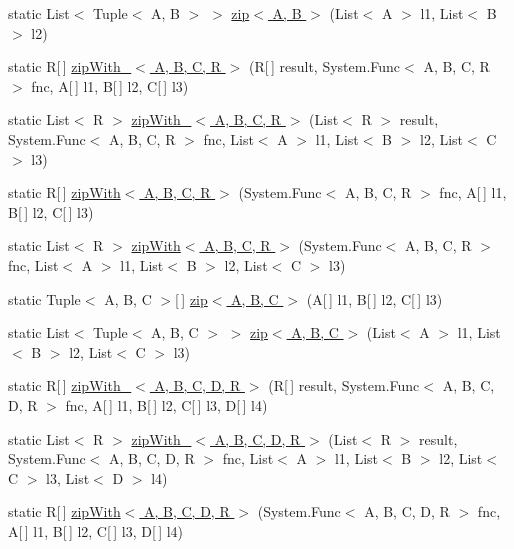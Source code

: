 \begin{DoxyCompactItemize}
static List$<$ Tuple$<$ A, B $>$ $>$ \hyperlink{class_prelude_aba247827694dc142c67ced1f0e53a1f0}{zip$<$ A, B $>$} (List$<$ A $>$ l1, List$<$ B $>$ l2)
\item 
static R\mbox{[}$\,$\mbox{]} \hyperlink{class_prelude_a0ebef028d31084954179de37225d236a}{zip\+With\+\_\+$<$ A, B, C, R $>$} (R\mbox{[}$\,$\mbox{]} result, System.\+Func$<$ A, B, C, R $>$ fnc, A\mbox{[}$\,$\mbox{]} l1, B\mbox{[}$\,$\mbox{]} l2, C\mbox{[}$\,$\mbox{]} l3)
\item 
static List$<$ R $>$ \hyperlink{class_prelude_a9d4d97111cff3c4cfb1a0dde826a4bb3}{zip\+With\+\_\+$<$ A, B, C, R $>$} (List$<$ R $>$ result, System.\+Func$<$ A, B, C, R $>$ fnc, List$<$ A $>$ l1, List$<$ B $>$ l2, List$<$ C $>$ l3)
\item 
static R\mbox{[}$\,$\mbox{]} \hyperlink{class_prelude_a01a166921e949a34a3e9fa4a13a012b3}{zip\+With$<$ A, B, C, R $>$} (System.\+Func$<$ A, B, C, R $>$ fnc, A\mbox{[}$\,$\mbox{]} l1, B\mbox{[}$\,$\mbox{]} l2, C\mbox{[}$\,$\mbox{]} l3)
\item 
static List$<$ R $>$ \hyperlink{class_prelude_af07f3707676119841eefb631c36320c8}{zip\+With$<$ A, B, C, R $>$} (System.\+Func$<$ A, B, C, R $>$ fnc, List$<$ A $>$ l1, List$<$ B $>$ l2, List$<$ C $>$ l3)
\item 
static Tuple$<$ A, B, C $>$\mbox{[}$\,$\mbox{]} \hyperlink{class_prelude_a329aa59f077cc72c89bc94a2cf85c871}{zip$<$ A, B, C $>$} (A\mbox{[}$\,$\mbox{]} l1, B\mbox{[}$\,$\mbox{]} l2, C\mbox{[}$\,$\mbox{]} l3)
\item 
static List$<$ Tuple$<$ A, B, C $>$ $>$ \hyperlink{class_prelude_a38f4ea6c226496660d52d40bc8bc7ad2}{zip$<$ A, B, C $>$} (List$<$ A $>$ l1, List$<$ B $>$ l2, List$<$ C $>$ l3)
\item 
static R\mbox{[}$\,$\mbox{]} \hyperlink{class_prelude_a57b69fc591aa82f8127c2ea69672d462}{zip\+With\+\_\+$<$ A, B, C, D, R $>$} (R\mbox{[}$\,$\mbox{]} result, System.\+Func$<$ A, B, C, D, R $>$ fnc, A\mbox{[}$\,$\mbox{]} l1, B\mbox{[}$\,$\mbox{]} l2, C\mbox{[}$\,$\mbox{]} l3, D\mbox{[}$\,$\mbox{]} l4)
\item 
static List$<$ R $>$ \hyperlink{class_prelude_a4e6a61086ac048ee0b2c08ebdd51e9f3}{zip\+With\+\_\+$<$ A, B, C, D, R $>$} (List$<$ R $>$ result, System.\+Func$<$ A, B, C, D, R $>$ fnc, List$<$ A $>$ l1, List$<$ B $>$ l2, List$<$ C $>$ l3, List$<$ D $>$ l4)
\item 
static R\mbox{[}$\,$\mbox{]} \hyperlink{class_prelude_ac2a262c3428db56bffdd0ed3473111d2}{zip\+With$<$ A, B, C, D, R $>$} (System.\+Func$<$ A, B, C, D, R $>$ fnc, A\mbox{[}$\,$\mbox{]} l1, B\mbox{[}$\,$\mbox{]} l2, C\mbox{[}$\,$\mbox{]} l3, D\mbox{[}$\,$\mbox{]} l4)

\end{DoxyCompactItemize}
